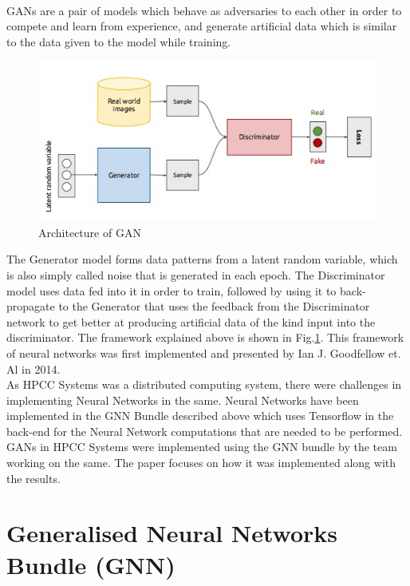 \documentclass[conference]{IEEEtran}
\begin{document}
\\
GANs are a pair of models which behave as adversaries to each other in order to compete and learn from experience, and generate artificial data which is similar to the data given to the model while training.
\\
\begin{figure}
    \centerline{\includegraphics[width=\columnwidth]{GAN_architecture.png}}
    \caption{Architecture of GAN}
    \label{fig:ganarch}
\end{figure}
The Generator model forms data patterns from a latent random variable, which is also simply called noise that is generated in each epoch. The Discriminator model uses data fed into it in order to train, followed by using it to back-propagate to the Generator that uses the feedback from the Discriminator network to get better at producing artificial data of the kind input into the discriminator. The framework explained above is shown in Fig.\ref{fig:ganarch}. This framework of neural networks was first implemented and presented by Ian J. Goodfellow et. Al in 2014\cite{iangan}.
\\
As HPCC Systems was a distributed computing system, there were challenges in implementing Neural Networks in the same. Neural Networks have been implemented in the GNN Bundle described above which uses Tensorflow in the back-end for the Neural Network computations that are needed to be performed. GANs in HPCC Systems were implemented using the GNN bundle by the team working on the same. The paper focuses on how it was implemented along with the results. 

\section{Generalised Neural Networks Bundle (GNN)}\label{gnnsec}
\end{document}
